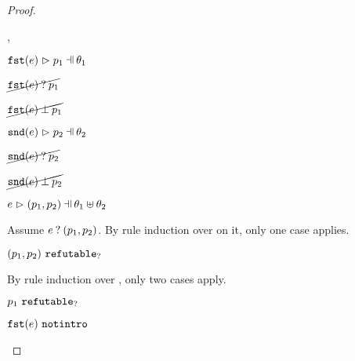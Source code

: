 \begin{proof}
\begin{byCases}
\begin{byCases}
        \begin{byCases}
        \item[\hpatmatch{\hfst{e}}{p_1}{\theta_1},\hpatmatch{\hsnd{e}}{p_2}{\theta_2}]
            \begin{pfsteps*}
            \item $\hpatmatch{\hfst{e}}{p_1}{\theta_1}$  
            \item $\cancel{\mathtt{fst}(e) \mathbin{?} p_1}$  
            \item $\cancel{\mathtt{fst}(e) \mathbin{\bot} p_1}$  
            \item $\hpatmatch{\hsnd{e}}{p_2}{\theta_2}$  
            \item $\cancel{\mathtt{snd}(e) \mathbin{?} p_2}$  
            \item $\cancel{\mathtt{snd}(e) \mathbin{\bot} p_2}$  
            \item $\hpatmatch{e}{\hpair{p_1}{p_2}}{\theta_1 \uplus \theta_2}$ 
            \end{pfsteps*}
            Assume $e \mathbin{?} (p_1 , p_2)$. By rule induction over  on it, only one case applies.
            \begin{byCases}
            \item[\text{(\ref{rule:MMNotIntro})}]
                \begin{pfsteps*}
                \item $(p_1 , p_2) ~\mathtt{refutable}_?$  
                \end{pfsteps*}
                By rule induction over , only two cases apply.
                \begin{byCases}
                \item[\text{(\ref{rule:RPairL})}]
                    \begin{pfsteps*}
                    \item $p_1 ~\mathtt{refutable}_?$  
                    \item $\mathtt{fst}(e) ~\mathtt{notintro}$  

\end{pfsteps*}
\end{byCases}
\end{byCases}
\end{byCases}
\end{byCases}
\end{byCases}
\end{proof}
